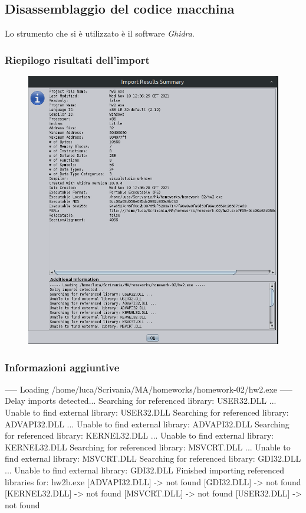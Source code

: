 \documentclass[a4paper, 12pt]{article}
\begin{document}
\subsection{Disassemblaggio del codice macchina}
Lo strumento che si è utilizzato è il software \emph{Ghidra}.

\subsubsection{Riepilogo risultati dell'import}
\begin{figure}[H]
\centering\includegraphics[width=\textwidth]{import_summary}
\end{figure}

\subsubsection{Informazioni aggiuntive}
\begin{spverbatim}
----- Loading /home/luca/Scrivania/MA/homeworks/homework-02/hw2.exe -----
Delay imports detected...
Searching for referenced library: USER32.DLL ...
Unable to find external library: USER32.DLL
Searching for referenced library: ADVAPI32.DLL ...
Unable to find external library: ADVAPI32.DLL
Searching for referenced library: KERNEL32.DLL ...
Unable to find external library: KERNEL32.DLL
Searching for referenced library: MSVCRT.DLL ...
Unable to find external library: MSVCRT.DLL
Searching for referenced library: GDI32.DLL ...
Unable to find external library: GDI32.DLL
Finished importing referenced libraries for: hw2b.exe
  [ADVAPI32.DLL] -> not found
  [GDI32.DLL] -> not found
  [KERNEL32.DLL] -> not found
  [MSVCRT.DLL] -> not found
  [USER32.DLL] -> not found

\end{spverbatim}
\end{document}
